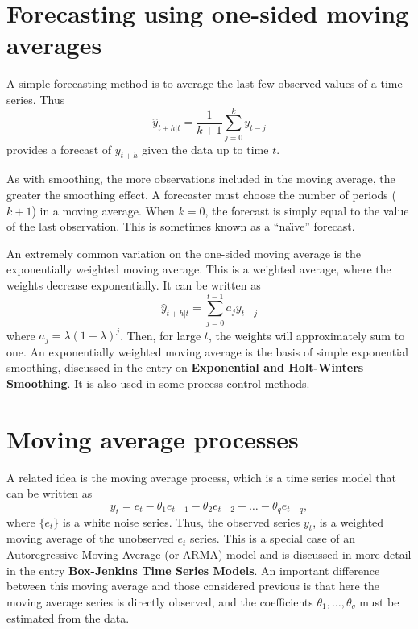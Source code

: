 \documentclass[a4paper,10pt]{article}
\begin{document}
\section{Forecasting using one-sided moving averages}
\label{sec:ma}

A simple forecasting method is to average the last few observed values of a time series. Thus
\[
	\hat{y}_{t+h|t} = \frac{1}{k+1}\sum_{j=0}^{k} y_{t-j}
\]
provides a forecast of $y_{t+h}$ given the data up to time $t$.

As with smoothing, the more observations included in the moving average, the greater the smoothing effect. A forecaster must choose the number of periods ($k+1$) in a moving average. When $k=0$, the forecast is simply equal to the value of the last observation. This is sometimes known as a ``na\"{\i}ve'' forecast.

An extremely common variation on the one-sided moving average is the exponentially weighted moving average. This is a weighted average, where the weights decrease exponentially. It can be written as
\[
	\hat{y}_{t+h|t} = \sum_{j=0}^{t-1} a_jy_{t-j}
\]
where $a_j = \lambda(1-\lambda)^j$. Then, for large $t$, the weights will approximately sum to one. An exponentially weighted moving average is the basis of simple exponential smoothing, discussed in the entry on \textbf{Exponential and Holt-Winters Smoothing}. It is also used in some process control methods.

\section{Moving average processes}

A related idea is the moving average process, which is a time series model that can be written as
\[
	y_t = e_t - \theta_1 e_{t-1} - \theta_2 e_{t-2} - \dots - \theta_q e_{t-q},
\]
where $\{e_t\}$ is a white noise series. Thus, the observed series $y_t$, is a weighted moving average of the unobserved $e_t$ series. This is a special case of an Autoregressive Moving Average (or ARMA) model and is discussed in more detail in the entry \textbf{Box-Jenkins Time Series Models}. An important difference between this moving average and those considered previous is that here the moving average series is directly observed, and the coefficients $\theta_1,\dots,\theta_q$ must be estimated from the data.

\nocite{Mills2021}


\end{document}
